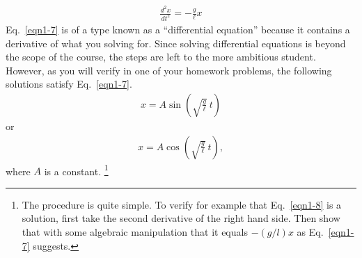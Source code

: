 \begin{eqnarray}\label{eqn1-7}
\frac{d^2x}{dt^2} = -\frac{g}{\ell}x
\end{eqnarray} 
Eq.~\ref{eqn1-7} is of a type known as a ``differential equation'' because it contains a derivative of what you solving for. Since solving differential equations is beyond the scope of the course, the steps are left to the more ambitious student.  However, as you will verify in one of your homework problems, the following solutions satisfy Eq.~\ref{eqn1-7}.
\begin{eqnarray}\label{eqn1-8}
x = A \sin\left(\sqrt{\frac{g}{\ell}}~t\right)
\end{eqnarray}
or
\begin{eqnarray}\label{eqn1-9}
x = A \cos\left(\sqrt{\frac{g}{\ell}}~t\right),
\end{eqnarray}
where $A$ is a constant. \footnote[1]{The procedure is quite simple.  To verify for example that Eq.~\ref{eqn1-8} is a solution, first take the second derivative of the right hand side. Then show that with some algebraic manipulation that it equals $-(g/l)x$ as Eq.~\ref{eqn1-7} suggests.}

